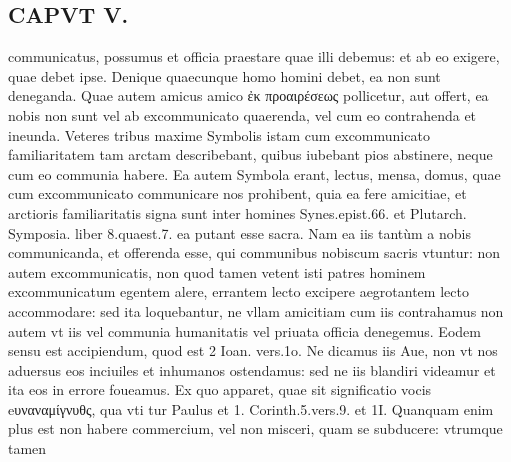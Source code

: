 \documentclass{article}
\begin{document}
\begin{pages}
\section*{CAPVT  V. }
\marginpar{[ p.405 ]}\pstart communicatus, possumus et officia praestare quae illi debemus: et ab eo exigere, quae debet ipse. Denique quaecunque homo homini debet, ea non sunt deneganda. Quae autem amicus amico ἐκ προαιρέσεως pollicetur, aut offert, ea nobis non sunt vel ab excommunicato quaerenda, vel cum eo contrahenda et ineunda. Veteres tribus maxime Symbolis istam cum excommunicato familiaritatem tam arctam describebant, quibus iubebant pios abstinere, neque  cum eo communia habere. Ea autem Symbola erant, lectus, mensa, domus, quae cum excommunicato communicare nos prohibent, quia ea fere amicitiae, et arctioris familiaritatis signa sunt inter homines Synes.epist.66. et Plutarch. Symposia. liber  8.quaest.7. ea putant esse sacra. Nam ea iis tantùm a nobis communicanda, et offerenda esse, qui communibus nobiscum sacris vtuntur: non autem excommunicatis, non quod tamen vetent isti patres hominem excommunicatum egentem alere, errantem lecto excipere aegrotantem lecto accommodare: sed ita loquebantur, ne vllam amicitiam cum iis contrahamus non autem vt iis vel communia humanitatis vel priuata officia denegemus. Eodem sensu est accipiendum, quod est 2 Ioan. vers.1o. Ne dicamus iis Aue, non vt nos aduersus eos inciuiles et inhumanos ostendamus: sed ne iis blandiri videamur et ita eos in errore foueamus. Ex quo apparet, quae sit significatio vocis eυναναμίγνυθς, qua vti tur Paulus et 1. Corinth.5.vers.9. et 1I. Quanquam enim plus est non habere commercium, vel non misceri, quam se subducere: vtrumque tamen  \pend

\end{pages}
\end{document}
